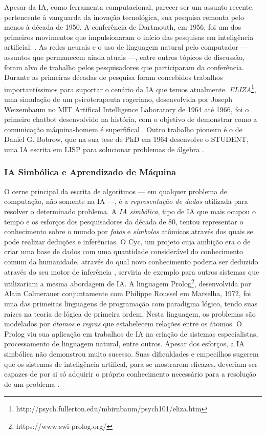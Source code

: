 \documentclass[12pt, a4paper]{article}
\begin{document}
Apesar da IA, como ferramenta computacional, parecer ser um assunto recente, 
pertencente à vanguarda da inovação tecnológica, sua pesquisa
remonta pelo menos à década de 1950.
A conferência de Dartmouth, em 1956, foi um dos primeiros movimentos que impulsionaram o início das 
pesquisas em inteligência artificial. \cite{dartmouth}.
As redes neurais e o uso de linguagem natural pelo computador --- assuntos que permanecem ainda atuais ---, entre outros tópicos de discussão,
foram alvo de trabalho pelos pesquisadores que participaram da conferência. 
Durante as primeiras décadas de pesquisa foram concebidos trabalhos importantíssimos para suportar o cenário da IA que temos atualmente.
\emph{ELIZA}\footnote{http://psych.fullerton.edu/mbirnbaum/psych101/eliza.htm}, 
uma simulação de um psicoterapeuta rogeriano, desenvolvida por Joseph Weizembaum no MIT Artifical Intelligence Laboratory de 1964 até 1966,
foi o primeiro chatbot desenvolvido na história, com o objetivo de demonstrar como a comunicação máquina-homem é superfifical \cite{wiezembaum}.
Outro trabalho pioneiro é o de Daniel G. Bobrow, que na sua tese de PhD em 1964 desenvolve o STUDENT, uma IA escrita em LISP para solucionar problemas
de álgebra \cite{student}.

\subsubsection{IA Simbólica e Aprendizado de Máquina}

O cerne principal da escrita de algoritmos --- em qualquer problema de computação, não somente na IA ---, 
é a \emph{representação de dados} utilizada para resolver o determinado problema. A \emph{IA simbólica},
tipo de IA que mais ocupou o tempo e os esforços dos pesquisadores da década de 80, tentou representar o conhecimento
sobre o mundo por \emph{fatos} e \emph{símbolos} atômicos através dos quais se pode realizar deduções e inferências. 
O Cyc, um projeto cuja ambição era o de criar uma
base de dados com uma quantidade considerável do conhecimento comum da humanidade, através do qual
novo conhecimento poderia ser deduzido através do seu motor de inferência \cite{cyc}, serviria de exemplo para outros sistemas
que utilizariam a mesma abordagem de IA. A linguagem Prolog\footnote{https://www.swi-prolog.org/}, 
desenvolvida por Alain Colmerauer conjuntamente com Philippe Roussel em Marselha, 1972, 
foi uma das primeiras linguagens de programação com paradigma lógico, tendo suas raízes na teoria de lógica de primeira ordem.
Nesta linguagem, os problemas são modelados por \emph{átomos} e \emph{regras} que estabelecem relações entre os átomos.
O Prolog viu sua aplicação em trabalhos de IA na criação de sistemas especialistas, processamento de linguagem natural, entre outros. 
Apesar dos esforços, a IA simbólica não demonstrou muito sucesso. Suas dificuldades e empecilhos sugerem que os sistemas de inteligência
artifical, para se mostrarem eficazes, deveriam ser capazes de por si só adquirir o próprio conhecimento necessário
para a resolução de um problema \cite[p.2]{Goodfellow-et-al-2016}.
\end{document}
